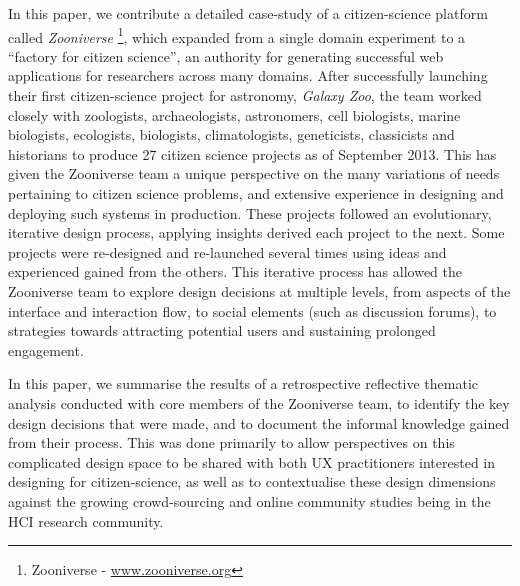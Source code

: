 \documentclass{sigchi}
\begin{document}
In this paper, we contribute a detailed case-study of a citizen-science platform called \emph{Zooniverse} \footnote{Zooniverse - \url{www.zooniverse.org}}, which expanded from a single domain experiment to a  ``factory for citizen science'', an authority for generating successful web applications for researchers across many domains.  After successfully launching their first citizen-science project for astronomy, \emph{Galaxy Zoo}, the team worked closely with zoologists, archaeologists, astronomers, cell biologists, marine biologists, ecologists, biologists, climatologists, geneticists, classicists and historians to produce 27 citizen science projects as of September 2013.  This has given the Zooniverse team a unique perspective on the many variations of needs pertaining to citizen science problems, and extensive experience in designing and deploying such systems in production. These projects followed an evolutionary, iterative design process, applying insights derived each project to the next.  Some projects were re-designed and re-launched several times using ideas and experienced gained from the others.   This iterative process has allowed the Zooniverse team to explore design decisions at multiple levels, from aspects of the interface and interaction flow, to social elements (such as discussion forums), to strategies towards attracting potential users and sustaining prolonged engagement. 

% 




In this paper, we summarise the results of a retrospective reflective thematic analysis conducted with core members of the Zooniverse team, to identify the key design decisions that were made, and to document the informal knowledge gained from their process.  This was done primarily to allow perspectives on this complicated design space to be shared with both UX practitioners interested in designing for citizen-science, as well as to contextualise these design dimensions against the growing crowd-sourcing and online community studies being in the HCI research community.  
\end{document}

